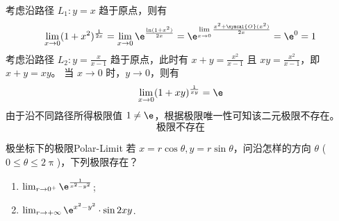 \begin{solution}
    考虑沿路径 $L_1: y = x$ 趋于原点，则有
    \begin{equation}
        \lim_{x \to 0} (1 + x^2)^{\frac{1}{2x}} = \lim_{x \to 0} \e^{\frac{\ln(1 + x^2)}{2x}} = \e^{\lim\limits_{x \to 0} \frac{x^2 + \symcal{O}(x^2)}{2x}} = \e^0 = 1
    \end{equation}
    考虑沿路径 $L_2: y = \frac{x}{x - 1}$ 趋于原点，此时有 $x + y = \frac{x^2}{x - 1}$ 且 $xy = \frac{x^2}{x - 1}$，即 $x + y = xy$。
    当 $x \to 0$ 时，$y \to 0$，则有
    \begin{equation}
        \lim_{x \to 0} (1 + xy)^{\frac{1}{xy}} = \e
    \end{equation}
    由于沿不同路径所得极限值 $1 \neq \e$，根据极限唯一性可知该二元极限不存在。
    \begin{equation}
        \boxed{\text{极限不存在}}
    \end{equation}
\end{solution}


\begin{problem}{极坐标下的极限}{Polar-Limit}
    若 $x = r \cos \theta, y = r \sin \theta$，问沿怎样的方向 $\theta$ ($0 \leqslant \theta \leqslant 2\uppi$)，下列极限存在？
    \begin{enumerate}
        \item $ \lim_{r \to 0^+} \e^{\frac{1}{x^2 - y^2}}$;
        \item $ \lim_{r \to +\infty} \e^{x^2 - y^2} \cdot \sin 2xy$.
    \end{enumerate}
\end{problem}

